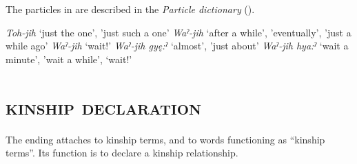 The particles in  are described in the \textit{Particle dictionary} ().

\newpage
\ea\label{ex:particle-jih}
\ea \textit{Toh-jih} ‘just the one’, 'just such a one’
\ex \textit{Waˀ-jih} ‘after a while’, 'eventually’, 'just a while ago’
\ex \textit{Waˀ-jih} ‘wait!’
\ex \textit{Waˀ-jih gyę:ˀ} ‘almost’, 'just about’
\ex \textit{Waˀ-jih hya:ˀ} ‘wait a minute’, 'wait a while’, ‘wait!’
\z 
\z 

\section{ \textsc{kinship declaration}}
The  {\declarekinship} ending attaches to kinship terms, and to words functioning as “kinship terms”. Its function is to declare a kinship relationship.

